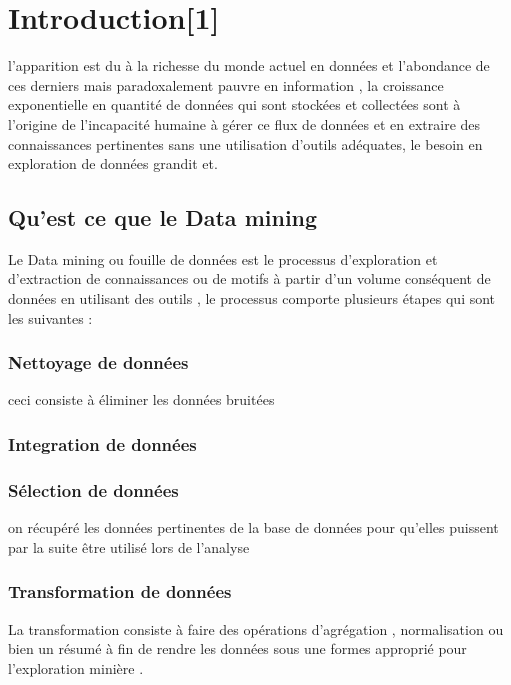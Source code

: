 \documentclass[12pt,a4paper,oneside]{book}
\begin{document}
	\def\reportnumber{}
	\def\reporttitle{Chapitres 1, 2 et 3}
	
	
	
	\sffamily

\setcounter{tocdepth}{1}
\tableofcontents
\newpage

\chapter{Introduction[1]}
l'apparition est du  à la richesse du monde actuel en données et l'abondance  de ces derniers  mais paradoxalement pauvre  en information ,  la croissance exponentielle en quantité de données qui sont stockées et collectées sont à l'origine de l'incapacité humaine à gérer ce flux  de données et en extraire des connaissances pertinentes sans une utilisation d'outils adéquates, le besoin en exploration de données grandit et.

\section{Qu'est ce que le Data mining}
Le Data mining ou fouille de données est le processus d'exploration et d'extraction de connaissances ou de motifs à partir d'un volume conséquent de données en utilisant des outils ,
le processus comporte plusieurs étapes qui sont les suivantes :
\subsection{Nettoyage de données}
ceci consiste à éliminer les données bruitées 
\subsection{Integration de données}

\subsection{Sélection de données}
on récupéré les données pertinentes de la base de données pour qu'elles puissent
par la suite être utilisé lors de l'analyse
\subsection{Transformation de données}
La transformation consiste à faire des opérations d'agrégation , normalisation ou bien un résumé à fin de rendre les données sous une formes approprié  pour l'exploration minière .  
\end{document}
